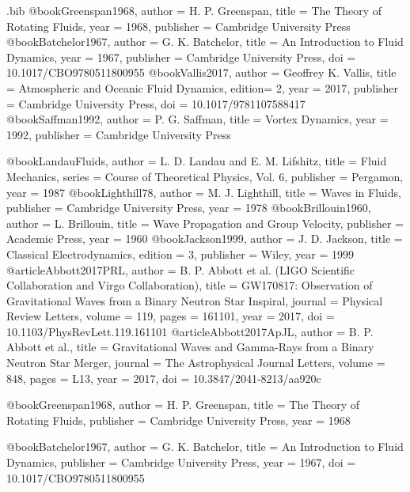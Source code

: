 \documentclass[12pt]{article}
\begin{document}
\begin{filecontents*}{\jobname.bib}
@book{Greenspan1968,
  author = {H. P. Greenspan},
  title  = {The Theory of Rotating Fluids},
  year   = {1968},
  publisher = {Cambridge University Press}
}
@book{Batchelor1967,
  author = {G. K. Batchelor},
  title  = {An Introduction to Fluid Dynamics},
  year   = {1967},
  publisher = {Cambridge University Press},
  doi    = {10.1017/CBO9780511800955}
}
@book{Vallis2017,
  author = {Geoffrey K. Vallis},
  title  = {Atmospheric and Oceanic Fluid Dynamics},
  edition= {2},
  year   = {2017},
  publisher = {Cambridge University Press},
  doi    = {10.1017/9781107588417}
}
@book{Saffman1992,
  author = {P. G. Saffman},
  title  = {Vortex Dynamics},
  year   = {1992},
  publisher = {Cambridge University Press}
}

    @book{LandauFluids,
  author    = {L. D. Landau and E. M. Lifshitz},
  title     = {Fluid Mechanics},
  series    = {Course of Theoretical Physics, Vol. 6},
  publisher = {Pergamon},
  year      = {1987}
}
@book{Lighthill78,
  author    = {M. J. Lighthill},
  title     = {Waves in Fluids},
  publisher = {Cambridge University Press},
  year      = {1978}
}
@book{Brillouin1960,
  author    = {L. Brillouin},
  title     = {Wave Propagation and Group Velocity},
  publisher = {Academic Press},
  year      = {1960}
}
@book{Jackson1999,
  author    = {J. D. Jackson},
  title     = {Classical Electrodynamics},
  edition   = {3},
  publisher = {Wiley},
  year      = {1999}
}
@article{Abbott2017PRL,
  author  = {B. P. Abbott et al. (LIGO Scientific Collaboration and Virgo Collaboration)},
  title   = {GW170817: Observation of Gravitational Waves from a Binary Neutron Star Inspiral},
  journal = {Physical Review Letters},
  volume  = {119},
  pages   = {161101},
  year    = {2017},
  doi     = {10.1103/PhysRevLett.119.161101}
}
@article{Abbott2017ApJL,
  author  = {B. P. Abbott et al.},
  title   = {Gravitational Waves and Gamma-Rays from a Binary Neutron Star Merger},
  journal = {The Astrophysical Journal Letters},
  volume  = {848},
  pages   = {L13},
  year    = {2017},
  doi     = {10.3847/2041-8213/aa920c}
}

    @book{Greenspan1968,
  author    = {H. P. Greenspan},
  title     = {The Theory of Rotating Fluids},
  publisher = {Cambridge University Press},
  year      = {1968}
}

@book{Batchelor1967,
  author    = {G. K. Batchelor},
  title     = {An Introduction to Fluid Dynamics},
  publisher = {Cambridge University Press},
  year      = {1967},
  doi       = {10.1017/CBO9780511800955}
}


\end{filecontents*}
\end{document}
